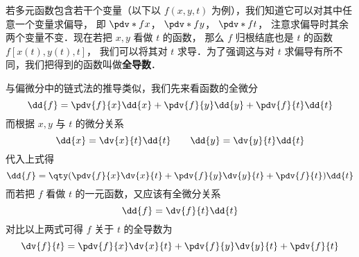 

若多元函数包含若干个变量（以下以 $f(x,y,t)$ 为例），我们知道它可以对其中任意一个变量求偏导， 即 $\pdv*{f}{x}$，  $\pdv*{f}{y}$，  $\pdv*{f}{t}$， 注意求偏导时其余两个变量不变．现在若把 $x,y$ 看做 $t$ 的函数， 那么 $f$ 归根结底也是 $t$ 的函数 $f[x(t),y(t),t]$， 我们可以将其对 $t$ 求导．为了强调这与对 $t$ 求偏导有所不同，我们把得到的函数叫做\textbf{全导数}．

与偏微分中的链式法的推导类似，我们先来看函数的全微分
\begin{equation}
\dd{f} = \pdv{f}{x} \dd{x} + \pdv{f}{y} \dd{y} + \pdv{f}{t} \dd{t}
\end{equation}
而根据 $x,y$ 与 $t$ 的微分关系
\begin{equation}
\dd{x} = \dv{x}{t} \dd{t} \qquad  \dd{y} = \dv{y}{t} \dd{t}
\end{equation}
代入上式得
\begin{equation}
\dd{f} = \qty( \pdv{f}{x}\dv{x}{t} + \pdv{f}{y}\dv{y}{t} + \pdv{f}{t} )\dd{t}
\end{equation}
而若把 $f$ 看做 $t$ 的一元函数，又应该有全微分关系
\begin{equation}
\dd{f} = \dv{f}{t} \dd{t}
\end{equation}
对比以上两式可得 $f$ 关于 $t$ 的全导数为
\begin{equation}
\dv{f}{t} = \pdv{f}{x}\dv{x}{t} + \pdv{f}{y}\dv{y}{t} + \pdv{f}{t}
\end{equation}

